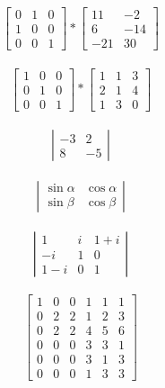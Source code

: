 \documentclass[a4paper]{article}
\begin{document}
$$ \left[
	\begin{array}{ccc}
		0 & 1 & 0 \\
		1 & 0 & 0 \\
		0 & 0 & 1 
	\end{array} \right] * \left[ \begin{array}{cc}
		11 & -2 \\
		6 & -14 \\
		-21 & 30 
	\end{array}
\right] $$ \\
$$ \left[
	\begin{array}{ccc}
		1 & 0 & 0 \\
		0 & 1 & 0 \\
		0 & 0 & 1 
	\end{array} \right] * \left[ \begin{array}{ccc}
		1 & 1 & 3 \\
		2 & 1 & 4 \\
		1 & 3 & 0 
	\end{array}
\right] $$ \\

$$ \left| \begin{array}{rr}
	-3 & 2 \\
	8 & -5
\end{array} \right| $$ \\

$$ \left| \begin{array}{cc}
	\sin \alpha & \cos \alpha \\
	\sin \beta & \cos \beta
\end{array} \right| $$ \\

$$ \left| \begin{array}{ccc}
	1 & i & 1+i \\
	-i & 1 & 0 \\
	1-i & 0 & 1
\end{array} \right| $$ \\

$$ \left[ \begin{array}{c|cc|ccc}
	1 & 0 & 0 & 1 & 1 & 1 \\
	\hline
	0 & 2 & 2 & 1 & 2 & 3 \\
	0 & 2 & 2 & 4 & 5 & 6 \\	
	\hline
	0 & 0 & 0 & 3 & 3 & 1 \\
	0 & 0 & 0 & 3 & 1 & 3 \\
	0 & 0 & 0 & 1 & 3 & 3
\end{array} \right] $$ \\
\end{document}
